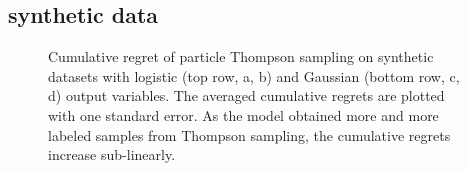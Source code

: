 \subsection{synthetic data}
\begin{figure}[t]
	\centering
	\caption{\label{fig:synthetic} Cumulative regret of particle Thompson sampling 
	on synthetic datasets with logistic	(top row, a, b) and Gaussian (bottom row, c, d) output variables.
	The averaged cumulative regrets  are plotted with one standard error. 
	As the model obtained more and more labeled samples from Thompson sampling, 
	the cumulative regrets increase sub-linearly.}
\end{figure}

